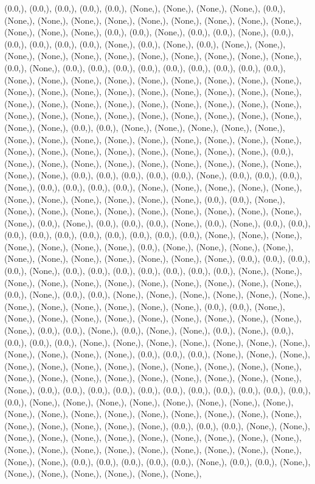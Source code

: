 \documentclass{article}
\begin{document}
(0.0,), (0.0,), (0.0,), (0.0,), (0.0,), (None,), (None,), (None,), (None,), (0.0,), (None,), (None,), (None,), (None,), (None,), (None,), (None,), (None,), (None,), (None,), (None,), (None,), (0.0,), (0.0,), (None,), (0.0,), (0.0,), (None,), (0.0,), (0.0,), (0.0,), (0.0,), (0.0,), (None,), (0.0,), (None,), (0.0,), (None,), (None,), (None,), (None,), (None,), (None,), (None,), (None,), (None,), (None,), (None,), (0.0,), (None,), (0.0,), (0.0,), (0.0,), (0.0,), (0.0,), (0.0,), (0.0,), (0.0,), (0.0,), (None,), (None,), (None,), (None,), (None,), (None,), (None,), (None,), (None,), (None,), (None,), (None,), (None,), (None,), (None,), (None,), (None,), (None,), (None,), (None,), (None,), (None,), (None,), (None,), (None,), (None,), (None,), (None,), (None,), (None,), (None,), (None,), (None,), (None,), (None,), (None,), (None,), (None,), (0.0,), (0.0,), (None,), (None,), (None,), (None,), (None,), (None,), (None,), (None,), (None,), (None,), (None,), (None,), (None,), (None,), (None,), (None,), (None,), (None,), (None,), (None,), (None,), (None,), (0.0,), (None,), (None,), (None,), (None,), (None,), (None,), (None,), (None,), (None,), (None,), (None,), (0.0,), (0.0,), (0.0,), (0.0,), (0.0,), (None,), (0.0,), (0.0,), (0.0,), (None,), (0.0,), (0.0,), (0.0,), (0.0,), (None,), (None,), (None,), (None,), (None,), (None,), (None,), (None,), (None,), (None,), (None,), (0.0,), (0.0,), (None,), (None,), (None,), (None,), (None,), (None,), (None,), (None,), (None,), (None,), (None,), (0.0,), (None,), (0.0,), (0.0,), (0.0,), (None,), (0.0,), (None,), (0.0,), (0.0,), (0.0,), (0.0,), (0.0,), (0.0,), (0.0,), (0.0,), (0.0,), (0.0,), (None,), (None,), (None,), (None,), (None,), (None,), (None,), (0.0,), (None,), (None,), (None,), (None,), (None,), (None,), (None,), (None,), (None,), (None,), (None,), (0.0,), (0.0,), (0.0,), (0.0,), (None,), (0.0,), (0.0,), (0.0,), (0.0,), (0.0,), (0.0,), (0.0,), (None,), (None,), (None,), (None,), (None,), (None,), (None,), (None,), (None,), (None,), (None,), (0.0,), (None,), (0.0,), (0.0,), (None,), (None,), (None,), (None,), (None,), (None,), (None,), (None,), (None,), (None,), (None,), (None,), (0.0,), (0.0,), (None,), (None,), (None,), (None,), (None,), (None,), (None,), (None,), (None,), (None,), (None,), (0.0,), (0.0,), (None,), (0.0,), (None,), (None,), (0.0,), (None,), (0.0,), (0.0,), (0.0,), (0.0,), (None,), (None,), (None,), (None,), (None,), (None,), (None,), (None,), (None,), (None,), (None,), (0.0,), (0.0,), (0.0,), (None,), (None,), (None,), (None,), (None,), (None,), (None,), (None,), (None,), (None,), (None,), (None,), (None,), (None,), (None,), (None,), (None,), (None,), (None,), (None,), (None,), (None,), (0.0,), (0.0,), (0.0,), (0.0,), (0.0,), (0.0,), (0.0,), (0.0,), (0.0,), (0.0,), (0.0,), (0.0,), (None,), (None,), (None,), (None,), (None,), (None,), (None,), (None,), (None,), (None,), (None,), (None,), (None,), (None,), (None,), (None,), (None,), (None,), (None,), (None,), (None,), (None,), (0.0,), (0.0,), (0.0,), (None,), (None,), (None,), (None,), (None,), (None,), (None,), (None,), (None,), (None,), (None,), (None,), (None,), (None,), (None,), (None,), (None,), (None,), (None,), (None,), (None,), (None,), (0.0,), (0.0,), (0.0,), (0.0,), (0.0,), (None,), (0.0,), (0.0,), (None,), (None,), (None,), (None,), (None,), (None,), (None,), 
\end{document}
